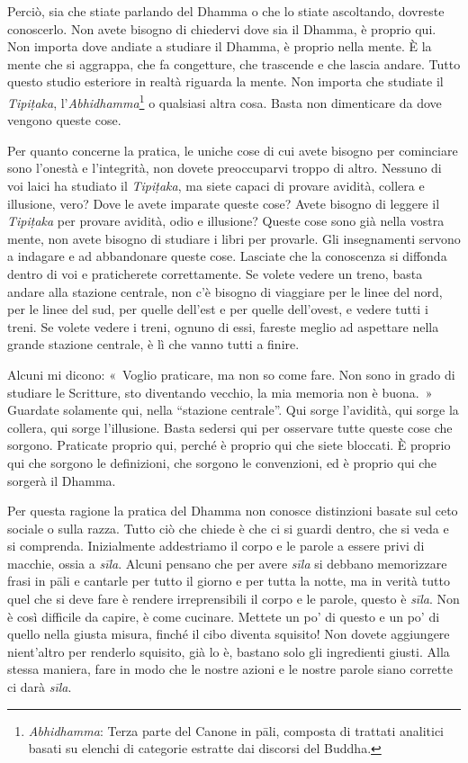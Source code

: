 Perciò, sia che stiate parlando del Dhamma o che lo stiate ascoltando,
dovreste conoscerlo. Non avete bisogno di chiedervi dove sia il Dhamma,
è proprio qui. Non importa dove andiate a studiare il Dhamma, è proprio
nella mente. È la mente che si aggrappa, che fa congetture, che
trascende e che lascia andare. Tutto questo studio esteriore in realtà
riguarda la mente. Non importa che studiate il \emph{Tipiṭaka},
l'\emph{Abhidhamma}\footnote{\emph{Abhidhamma}: Terza parte del Canone
  in pāli, composta di trattati analitici basati su elenchi di categorie
  estratte dai discorsi del Buddha.} o qualsiasi altra cosa. Basta non
dimenticare da dove vengono queste cose.

Per quanto concerne la pratica, le uniche cose di cui avete bisogno per
cominciare sono l'onestà e l'integrità, non dovete preoccuparvi troppo
di altro. Nessuno di voi laici ha studiato il \emph{Tipiṭaka}, ma siete
capaci di provare avidità, collera e illusione, vero? Dove le avete
imparate queste cose? Avete bisogno di leggere il \emph{Tipiṭaka} per
provare avidità, odio e illusione? Queste cose sono già nella vostra
mente, non avete bisogno di studiare i libri per provarle. Gli
insegnamenti servono a indagare e ad abbandonare queste cose. Lasciate
che la conoscenza si diffonda dentro di voi e praticherete
correttamente. Se volete vedere un treno, basta andare alla stazione
centrale, non c'è bisogno di viaggiare per le linee del nord, per le
linee del sud, per quelle dell'est e per quelle dell'ovest, e vedere
tutti i treni. Se volete vedere i treni, ognuno di essi, fareste meglio
ad aspettare nella grande stazione centrale, è lì che vanno tutti a
finire.

Alcuni mi dicono: «~Voglio praticare, ma non so come fare. Non sono in
grado di studiare le Scritture, sto diventando vecchio, la mia memoria
non è buona.~» Guardate solamente qui, nella ``stazione centrale''. Qui
sorge l'avidità, qui sorge la collera, qui sorge l'illusione. Basta
sedersi qui per osservare tutte queste cose che sorgono. Praticate
proprio qui, perché è proprio qui che siete bloccati. È proprio qui che
sorgono le definizioni, che sorgono le convenzioni, ed è proprio qui che
sorgerà il Dhamma.

Per questa ragione la pratica del Dhamma non conosce distinzioni basate
sul ceto sociale o sulla razza. Tutto ciò che chiede è che ci si guardi
dentro, che si veda e si comprenda. Inizialmente addestriamo il corpo e
le parole a essere privi di macchie, ossia a \emph{sīla}. Alcuni pensano
che per avere \emph{sīla} si debbano memorizzare frasi in pāli e
cantarle per tutto il giorno e per tutta la notte, ma in verità tutto
quel che si deve fare è rendere irreprensibili il corpo e le parole,
questo è \emph{sīla}. Non è così difficile da capire, è come cucinare.
Mettete un po' di questo e un po' di quello nella giusta misura, finché
il cibo diventa squisito! Non dovete aggiungere nient'altro per renderlo
squisito, già lo è, bastano solo gli ingredienti giusti. Alla stessa
maniera, fare in modo che le nostre azioni e le nostre parole siano
corrette ci darà \emph{sīla}.

